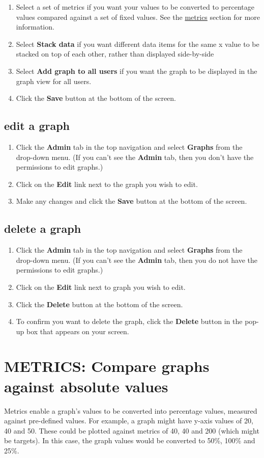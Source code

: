 \documentclass{ctrlo-int-toc}
\begin{document}
\begin{admin}
\begin{enumerate}
\item Select a set of metrics if you want your values to be converted to percentage values compared against a set of fixed values. See the \hyperref[sec:metrics]{metrics} section for more information.
\item Select \textbf{Stack data} if you want different data items for the same x value to be stacked on top of each other, rather than displayed side-by-side
\item Select \textbf{Add graph to all users} if you want the graph to be displayed in the graph view for all users.
\item Click the \textbf{Save} button at the bottom of the screen.
\end{enumerate}
\subsection[edit a graph ]{edit a graph }
\begin{enumerate}
\item Click the \textbf{Admin} tab in the top navigation and select \textbf{Graphs} from the drop-down menu. (If you can't see the \textbf{Admin} tab, then you don't have the permissions to edit graphs.)
\item Click on the \textbf{Edit} link next to the graph you wish to edit. 
\item Make any changes and click the \textbf{Save} button at the bottom of the screen.
\end{enumerate}
\subsection[delete a graph ]{delete a graph }
\begin{enumerate}
\item Click the \textbf{Admin} tab in the top navigation and select \textbf{Graphs} from the drop-down menu. (If you can't see the \textbf{Admin} tab, then you do not have the permissions to edit graphs.)
\item Click on the \textbf{Edit} link next to graph you wish to edit.
\item Click the \textbf{Delete} button at the bottom of the screen.
\item To confirm you want to delete the graph, click the \textbf{Delete} button in the pop-up box that appears on your screen. 
\end{enumerate}


\clearpage\section[METRICS: Compare graphs against absolute values]{METRICS: Compare graphs against absolute values}
\label{sec:metrics}
Metrics enable a graph's values to be converted into percentage values, measured against pre-defined values. For example, a graph might have y-axis values of 20, 40 and 50. These could be plotted against metrics of 40, 40 and 200 (which might be targets). In this case, the graph values would be converted to 50\%, 100\% and 25\%.


\end{admin}
\end{document}
